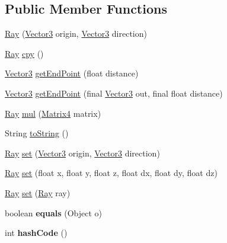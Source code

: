 \subsection*{Public Member Functions}
\begin{DoxyCompactItemize}
\item 
\hyperlink{classairhockeyjava_1_1util_1_1collision_1_1_ray_a17f5bdaa0911ff8221ba30609e8ec893}{Ray} (\hyperlink{classairhockeyjava_1_1util_1_1_vector3}{Vector3} origin, \hyperlink{classairhockeyjava_1_1util_1_1_vector3}{Vector3} direction)
\item 
\hyperlink{classairhockeyjava_1_1util_1_1collision_1_1_ray}{Ray} \hyperlink{classairhockeyjava_1_1util_1_1collision_1_1_ray_a7d7673f2283a6747efe4772d3fc84f16}{cpy} ()
\item 
\hyperlink{classairhockeyjava_1_1util_1_1_vector3}{Vector3} \hyperlink{classairhockeyjava_1_1util_1_1collision_1_1_ray_a8d155d838b8d37137ec2ba6cc7166283}{get\+End\+Point} (float distance)
\item 
\hyperlink{classairhockeyjava_1_1util_1_1_vector3}{Vector3} \hyperlink{classairhockeyjava_1_1util_1_1collision_1_1_ray_aa8f33022ae85840bc30dc51bc2623feb}{get\+End\+Point} (final \hyperlink{classairhockeyjava_1_1util_1_1_vector3}{Vector3} out, final float distance)
\item 
\hyperlink{classairhockeyjava_1_1util_1_1collision_1_1_ray}{Ray} \hyperlink{classairhockeyjava_1_1util_1_1collision_1_1_ray_a2417c55139882d8e1cc826c573ced0d7}{mul} (\hyperlink{classairhockeyjava_1_1util_1_1_matrix4}{Matrix4} matrix)
\item 
String \hyperlink{classairhockeyjava_1_1util_1_1collision_1_1_ray_a6be64f310baca0a559945b6b1bdd84cc}{to\+String} ()
\item 
\hyperlink{classairhockeyjava_1_1util_1_1collision_1_1_ray}{Ray} \hyperlink{classairhockeyjava_1_1util_1_1collision_1_1_ray_ad34711575dc7aed2769f9a5e5743212c}{set} (\hyperlink{classairhockeyjava_1_1util_1_1_vector3}{Vector3} origin, \hyperlink{classairhockeyjava_1_1util_1_1_vector3}{Vector3} direction)
\item 
\hyperlink{classairhockeyjava_1_1util_1_1collision_1_1_ray}{Ray} \hyperlink{classairhockeyjava_1_1util_1_1collision_1_1_ray_a2e7ac06a672594bc4c63e50b63635889}{set} (float x, float y, float z, float dx, float dy, float dz)
\item 
\hyperlink{classairhockeyjava_1_1util_1_1collision_1_1_ray}{Ray} \hyperlink{classairhockeyjava_1_1util_1_1collision_1_1_ray_aa8277e0216a9a0b7bf7479dfbcee27d4}{set} (\hyperlink{classairhockeyjava_1_1util_1_1collision_1_1_ray}{Ray} ray)
\item 
\hypertarget{classairhockeyjava_1_1util_1_1collision_1_1_ray_a22a22c712f4e952f21e75f4f32385761}{}boolean {\bfseries equals} (Object o)\label{classairhockeyjava_1_1util_1_1collision_1_1_ray_a22a22c712f4e952f21e75f4f32385761}

\item 
\hypertarget{classairhockeyjava_1_1util_1_1collision_1_1_ray_a60b7399c5f6a3533ff3608c357dfb172}{}int {\bfseries hash\+Code} ()\label{classairhockeyjava_1_1util_1_1collision_1_1_ray_a60b7399c5f6a3533ff3608c357dfb172}

\end{DoxyCompactItemize}
